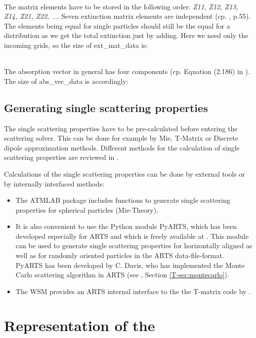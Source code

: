 \\
The matrix elements have to be stored in the following order: {\sl Z11,
  Z12, Z13, Z14, Z21, Z22,~...} Seven extinction matrix elements are
independent (cp. \citet{Mishchenko:02}, p.55). The elements being equal for
single particles should still be the equal for a distribution as we
get the total extinction just by adding. Here we need only the
incoming grids, so the size of ext\_mat\_data is: 

\\
The absorption vector in general has four components (cp. Equation
(2.186) in \citet{Mishchenko:02}). The size of abs\_vec\_data is
accordingly: 


\subsection{Generating single scattering properties}
The single scattering properties have to be pre-calculated before entering the
scattering solver. This can be done for example by Mie, T-Matrix or
Discrete dipole approximation methods. Different methods for the calculation of
single scattering properties are reviewed in \citet{emde05:_phdthesis}.

Calculations of the single scattering properties can be done by external tools
or by internally interfaced methods:
\begin{itemize}
\item
The ATMLAB package includes functions to generate single scattering
properties for spherical particles (Mie-Theory). 
\item
It is also convenient to use the Python module PyARTS, which has been
developed especially for ARTS and which is freely available at
. This
module can be used to generate single scattering properties for
horizontally aligned as well as for randomly oriented particles in the
ARTS data-file-format. PyARTS has been developed by C. Davis, who has
implemented the Monte Carlo scattering algorithm in ARTS (see
\theory, Section \ref{T-sec:montecarlo}).
\item
The WSM  provides an ARTS internal interface
to the the T-matrix code by \citet{Mishchenko:02}.
\end{itemize}

\section[Particle size distributions]
{Representation of the }
\label{sec:clouds:size_distr}

